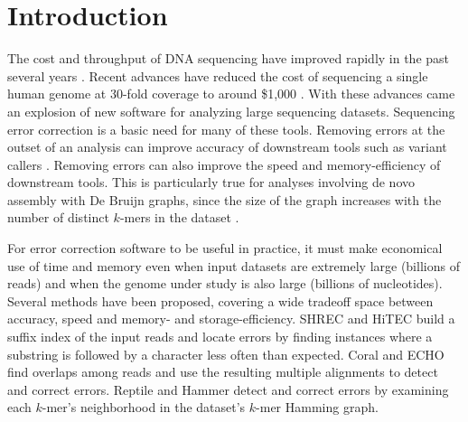 \documentclass[10pt]{article}
\begin{document}


\section*{Introduction}
The cost and throughput of DNA sequencing have improved rapidly in the past several years \cite{glenn2011field}.
Recent advances have reduced the cost of sequencing a single human genome at 30-fold coverage to around \$1,000 \cite{1kgenomeforreal}.
With these advances came an explosion of new software for analyzing large sequencing datasets.
Sequencing error correction is a basic need for many of these tools.
Removing errors at the outset of an analysis can improve accuracy of downstream tools such as variant callers \cite{kelley2010quake}.
Removing errors can also improve the speed and memory-efficiency of downstream tools.
This is particularly true for analyses involving de novo assembly with De Bruijn graphs, since the size of the graph increases with the number of distinct $k$-mers in the dataset \cite{pevzner2001eulerian, chaisson2004fragment}.

For error correction software to be useful in practice, it must make economical use of time and memory even when input datasets are extremely large (billions of reads) and when the genome under study is also large (billions of nucleotides).
Several methods have been proposed, covering a wide tradeoff space between accuracy, speed and memory- and storage-efficiency.
SHREC \cite{schroder2009shrec} and HiTEC \cite{ilie2011hitec} build a suffix index of the input reads and locate errors by finding instances where a substring is followed by a character less often than expected.
Coral \cite{salmela2011correcting} and ECHO \cite{kao2011echo} find overlaps among reads and use the resulting multiple alignments to detect and correct errors.
Reptile \cite{yang2010reptile} and Hammer \cite{medvedev2011error} detect and correct errors by examining each $k$-mer's neighborhood in the dataset's $k$-mer Hamming graph.
\end{document}
